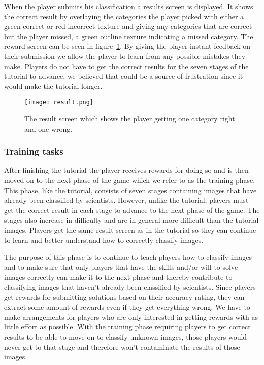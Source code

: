 When the player submits his classification a results screen is displayed. It shows the correct result by overlaying the categories the player picked with either a green correct or red incorrect texture and giving any categories that are correct but the player missed, a green outline texture indicating a missed category. The reward screen can be seen in figure~\ref{fig:result}. By giving the player instant feedback on their submission we allow the player to learn from any possible mistakes they make. Players do not have to get the correct results for the seven stages of the tutorial to advance, we believed that could be a source of frustration since it would make the tutorial longer. 

\begin{figure}[H]
\centering
\graphicspath{ {./graphics/} }
\centerline{\texttt{[image: result.png]}}
\caption{\label{fig:result}The result screen which shows the player getting one category right and one wrong.}
\end{figure}

\subsubsection{Training tasks}
After finishing the tutorial the player receives rewards for doing so and is then moved on to the next phase of the game which we refer to as the training phase. This phase, like the tutorial, consists of seven stages containing images that have already been classified by scientists. However, unlike the tutorial, players must get the correct result in each stage to advance to the next phase of the game. The stages also increase in difficulty and are in general more difficult than the tutorial images. Players get the same result screen as in the tutorial so they can continue to learn and better understand how to correctly classify images. 

The purpose of this phase is to continue to teach players how to classify images and to make sure that only players that have the skills and/or will to solve images correctly can make it to the next phase and thereby contribute to classifying images that haven't already been classified by scientists. Since players get rewards for submitting solutions based on their accuracy rating, they can extract some amount of rewards even if they get everything wrong. We have to make arrangements for players who are only interested in getting rewards with as little effort as possible. With the training phase requiring players to get correct results to be able to move on to classify unknown images, those players would never get to that stage and therefore won't contaminate the results of those images.


